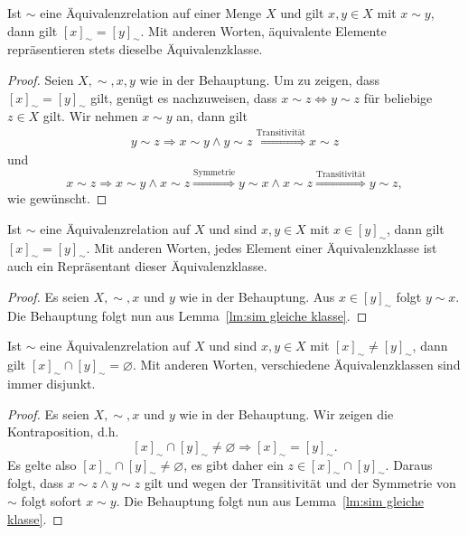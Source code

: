 \begin{lm}\label{lm:sim gleiche klasse}
Ist $\sim $ eine Äquivalenzrelation auf einer Menge $X$ und gilt $x,y\in X$ mit $x\sim y$, dann gilt $[x]_\sim=[y]_\sim$. Mit anderen Worten, äquivalente Elemente repräsentieren stets dieselbe Äquivalenzklasse.
\end{lm}
\begin{proof}
Seien $X,\sim,x,y$ wie in der Behauptung. Um zu zeigen, dass $[x]_\sim=[y]_\sim$ gilt, genügt es nachzuweisen, dass $x\sim z\Leftrightarrow y\sim z$ für beliebige $z\in X$ gilt. Wir nehmen $x\sim y$ an, dann gilt
\begin{align*}
y\sim z\Rightarrow x\sim y\land y\sim z \stackrel{\text{Transitivität}}{\Longrightarrow} x\sim z
\end{align*}
und
\[
x\sim z\Rightarrow x\sim y\land x\sim z\stackrel{\text{Symmetrie}}{\Longrightarrow} y\sim x\land x\sim z\stackrel{\text{Transitivität}}{\Longrightarrow} y\sim z,
\]
wie gewünscht.
\end{proof}
\begin{cor}\label{cor:alle Elemente Repräsentanten}
Ist $\sim $ eine Äquivalenzrelation auf $X$ und sind $x,y\in X$ mit $x\in[y]_\sim$, dann gilt $[x]_\sim=[y]_\sim$. Mit anderen Worten, jedes Element einer Äquivalenzklasse ist auch ein Repräsentant dieser Äquivalenzklasse.
\end{cor}
\begin{proof}
Es seien $X,\sim,x$ und $y$ wie in der Behauptung. Aus $x\in[y]_\sim$ folgt $y\sim x$. Die Behauptung folgt nun aus Lemma~\ref{lm:sim gleiche klasse}.
\end{proof}

\begin{satz}\label{satz: equivalenzklassen disjunkt}
Ist $\sim $ eine Äquivalenzrelation auf $X$ und sind $x,y\in X$ mit $[x]_\sim\neq[y]_\sim$, dann gilt $[x]_\sim\cap[y]_\sim=\varnothing$.
Mit anderen Worten, verschiedene Äquivalenzklassen sind immer disjunkt.
\end{satz}
\begin{proof}
Es seien $X,\sim,x$ und $y$ wie in der Behauptung. Wir zeigen die Kontraposition, d.h.
\[
[x]_\sim\cap[y]_\sim\neq\varnothing\Rightarrow [x]_\sim=[y]_\sim.
\]
Es gelte also $[x]_\sim\cap[y]_\sim\neq\varnothing$, es gibt daher ein $z\in [x]_\sim\cap[y]_\sim$. Daraus folgt, dass $x\sim z\land y\sim z$ gilt und wegen der Transitivität und der Symmetrie von $\sim$ folgt sofort $x\sim y$. Die Behauptung folgt nun aus Lemma~\ref{lm:sim gleiche klasse}.
\end{proof}


